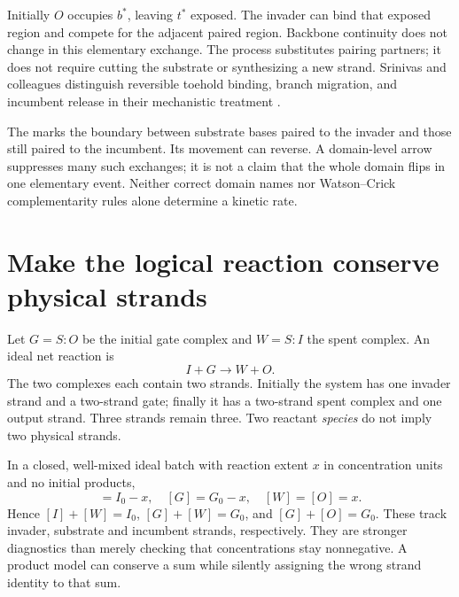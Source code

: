 Initially $O$ occupies $b^*$, leaving $t^*$ exposed. The invader can bind that
exposed region and compete for the adjacent paired region. Backbone continuity
does not change in this elementary exchange. The process substitutes pairing
partners; it does not require cutting the substrate or synthesizing a new strand.
Srinivas and colleagues distinguish reversible toehold binding, branch migration,
and incumbent release in their mechanistic treatment \cite{Srinivas2013}.


The  marks the boundary between substrate bases paired to
the invader and those still paired to the incumbent. Its movement can reverse.
A domain-level arrow suppresses many such exchanges; it is not a claim that
the whole domain flips in one elementary event. Neither correct domain names
nor Watson--Crick complementarity rules alone determine a kinetic rate.

\section{Make the logical reaction conserve physical strands}
Let $G=S{:}O$ be the initial gate complex and $W=S{:}I$ the spent complex.
An ideal net reaction is
\begin{equation}
 I+G\longrightarrow W+O.
 \label{eq:net}
\end{equation}
The two complexes each contain two strands. Initially the system has one
invader strand and a two-strand gate; finally it has a two-strand spent complex
and one output strand. Three strands remain three. Two reactant \emph{species}
do not imply two physical strands.

In a closed, well-mixed ideal batch with reaction extent $x$ in concentration
units and no initial products,
\begin{equation}
 [I]=I_0-x,\quad [G]=G_0-x,\quad [W]=[O]=x.
 \label{eq:inventory}
\end{equation}
Hence $[I]+[W]=I_0$, $[G]+[W]=G_0$, and $[G]+[O]=G_0$.
These track invader, substrate and incumbent strands, respectively. They are
stronger diagnostics than merely checking that concentrations stay nonnegative.
A product model can conserve a sum while silently assigning the wrong strand
identity to that sum.


